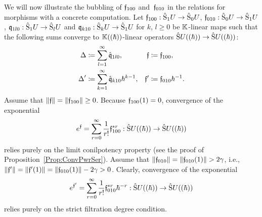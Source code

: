 \documentclass[\MainFolder/Text.tex]{subfiles}
\begin{document}
\begin{Example}
We will now illustrate the bubbling of $\mathfrak{f}_{100}$ and~$\mathfrak{f}_{010}$ in the relations for morphisms with a concrete computation. Let $\mathfrak{f}_{100}: \hat{\mathrm{S}}_1 U \rightarrow\hat{\mathrm{S}}_0 U$, $\mathfrak{f}_{010}: \hat{\mathrm{S}}_0 U \rightarrow \hat{\mathrm{S}}_1 U$, $\mathfrak{q}_{1l0}: \hat{\mathrm{S}}_1 U \rightarrow \hat{\mathrm{S}}_l U$ and $\mathfrak{q}_{k10}: \hat{\mathrm{S}}_k U \rightarrow \hat{\mathrm{S}}_1 U$ for $k$, $l\ge 0$ be $\mathbb{K}$-linear maps such that the following sums converge to $\mathbb{K}((\hbar))$-linear operators $\hat{\mathrm{S}}U((\hbar))\rightarrow\hat{\mathrm{S}}U((\hbar))$:
\begin{align*}
\operatorname{\Delta} &\coloneqq \sum_{l=1}^\infty \hat{\mathfrak{q}}_{1l0}, & \mathfrak{f}&\coloneqq \mathfrak{f}_{100}, \\
\operatorname{\Delta}'&\coloneqq \sum_{k=1}^\infty \hat{\mathfrak{q}}_{k10}\hbar^{k-1}, & \mathfrak{f}' &\coloneqq\mathfrak{f}_{010}\hbar^{-1}.
\end{align*}
Assume that $\| \mathfrak{f} \| = \| \mathfrak{f}_{100} \|\ge 0$. Because $\mathfrak{f}_{100}(1)=0$, convergence of the exponential
$$ e^{\mathfrak{f}} = \sum_{r=0}^\infty \frac{1}{r!}\mathfrak{f}_{100}^{* r}: \hat{\mathrm{S}}U((\hbar))\rightarrow\hat{\mathrm{S}}U((\hbar)) $$
relies purely on the limit conilpotency property (see the proof of Proposition~\ref{Prop:ConvPwrSer}). Assume that $\Norm{\HTP_{010}} = \Norm{\HTP_{010}(1)}>2\gamma$, i.e., $\| \mathfrak{f}' \| = \| \mathfrak{f}'(1) \| = \| \mathfrak{f}_{010}(1) \| - 2 \gamma >0$. Clearly, convergence of the exponential
\begin{equation}\label{Eq:ExpII}
e^{\mathfrak{f}'} = \sum_{r=0}^\infty \frac{1}{r!}\mathfrak{f}_{010}^{* r}\hbar^{-r}: \hat{\mathrm{S}}U((\hbar))\rightarrow\hat{\mathrm{S}}U((\hbar))
\end{equation}
relies purely on the strict filtration degree condition. 


\end{Example}
\end{document}

